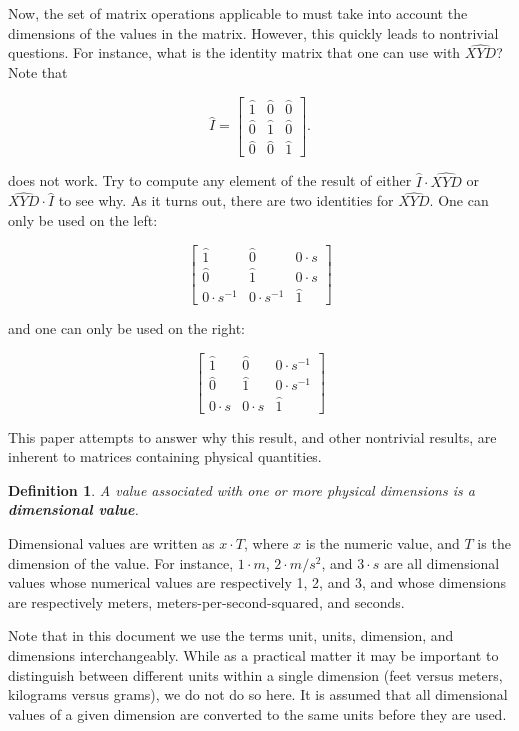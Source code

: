 \documentclass[10pt,letterpaper]{article}
\newtheorem{defn}{Definition}[section]
\numberwithin{equation}{section}
\begin{document}
Now, the set of matrix operations applicable to must take into account the dimensions of the values in the matrix.  However, this quickly leads to nontrivial questions.  For instance, what is the identity matrix that one can use with $\widehat{XYD}$?  Note that

\[ \hat I = \left[ \begin{matrix} 
  \hat 1 & \hat 0 & \hat 0 \\
  \hat 0 & \hat 1 & \hat 0 \\
  \hat 0 & \hat 0 & \hat 1
 \end{matrix} \right]. \]
 
does not work.  Try to compute any element of the result of either $\hat I \cdot \widehat{XYD}$ or $\widehat{XYD} \cdot \hat I$ to see why.  As it turns out, there are two identities for $\widehat{XYD}$.  One can only be used on the left:
 
 \[ \left[ \begin{matrix} 
  \hat 1 & \hat 0 & 0 \cdot s \\
  \hat 0 & \hat 1 & 0 \cdot s \\
  0 \cdot s^{-1} & 0 \cdot s^{-1} & \hat 1
 \end{matrix} \right] \]

and one can only be used on the right:

\[ \left[ \begin{matrix} 
  \hat 1 & \hat 0 & 0 \cdot s^{-1} \\
  \hat 0 & \hat 1 & 0 \cdot s^{-1} \\
  0 \cdot s & 0 \cdot s & \hat 1
 \end{matrix} \right] \]
 
This paper attempts to answer why this result, and other nontrivial results, are inherent to matrices containing physical quantities.

\begin{defn} A value associated with one or more physical dimensions is a \textbf{dimensional value}. \end{defn}

Dimensional values are written as $x \cdot T$, where $x$ is the numeric value, and $T$ is the dimension of the value.  For instance, $1 \cdot m$, $2 \cdot m/s^2$, and $3 \cdot s$ are all dimensional values whose numerical values are respectively 1, 2, and 3, and whose dimensions are respectively meters, meters-per-second-squared, and seconds.
 
Note that in this document we use the terms unit, units, dimension, and dimensions interchangeably.  While as a practical matter it may be important to distinguish between different units within a single dimension (feet versus meters, kilograms versus grams), we do not do so here.  It is assumed that all dimensional values of a given dimension are converted to the same units before they are used.
 
\end{document}
